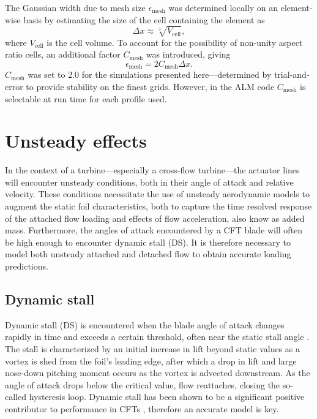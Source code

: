 \documentclass[times]{weauth}
\begin{document}
The Gaussian width due to mesh size $\epsilon_{\mathrm{mesh}}$ was determined
locally on an element-wise basis by estimating the size of the cell containing
the element as
\begin{equation}
    \Delta x \approx \sqrt[3]{V_\mathrm{cell}},
\end{equation}
where $V_\mathrm{cell}$ is the cell volume. To account for the possibility of
non-unity aspect ratio cells, an additional factor $C_\mathrm{mesh}$ was
introduced, giving
\begin{equation}
    \epsilon_{\mathrm{mesh}} = 2C_\mathrm{mesh} \Delta x.
\end{equation}
$C_{\mathrm{mesh}}$ was set to 2.0 for the simulations presented
here---determined by trial-and-error to provide stability on the finest grids.
However, in the ALM code $C_{\mathrm{mesh}}$ is selectable at run time for each
profile used.


\section{Unsteady effects}

In the context of a turbine---especially a cross-flow turbine---the actuator
lines will encounter unsteady conditions, both in their angle of attack and
relative velocity. These conditions necessitate the use of unsteady aerodynamic
models to augment the static foil characteristics, both to capture the time
resolved response of the attached flow loading and effects of flow acceleration,
also know as added mass. Furthermore, the angles of attack encountered by a CFT
blade will often be high enough to encounter dynamic stall (DS). It is therefore
necessary to model both unsteady attached and detached flow to obtain accurate
loading predictions.


\subsection{Dynamic stall}

Dynamic stall (DS) is encountered when the blade angle of attack changes rapidly
in time and exceeds a certain threshold, often near the static stall angle
\cite{McCroskey1981}. The stall is characterized by an initial increase in lift
beyond static values as a vortex is shed from the foil's leading edge, after
which a drop in lift and large nose-down pitching moment occurs as the vortex is
advected downstream. As the angle of attack drops below the critical value, flow
reattaches, closing the so-called hysteresis loop. Dynamic stall has been shown
to be a significant positive contributor to performance in CFTs \cite{Para2002,
    Urbina2013}, therefore an accurate model is key.
\end{document}
